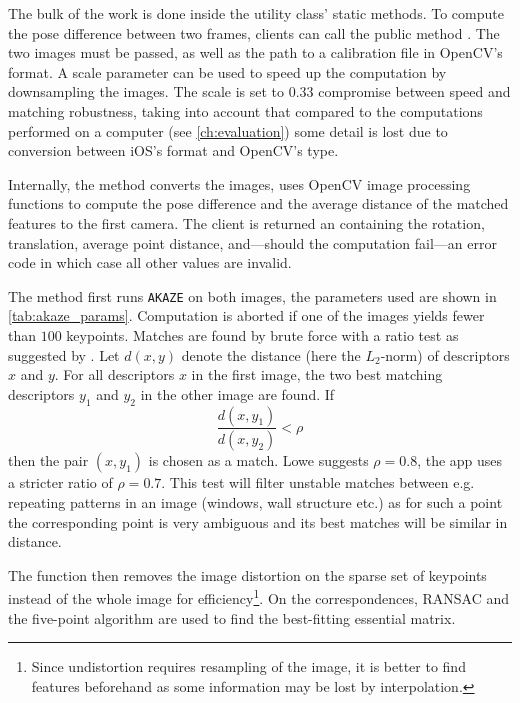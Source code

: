 
The bulk of the work is done inside the utility class'  static
methods. To compute the pose difference between two frames, clients can call the
public method .
The two images must be passed, as well as the path to a calibration file in
OpenCV's  format. A scale parameter can be used to speed up
the computation by downsampling the images.  The scale is set to $0.33$
compromise between speed and matching robustness, taking into account that
compared to the computations performed on a computer (see
\autoref{ch:evaluation}) some detail is lost due to conversion between iOS's
 format and OpenCV's  type.

Internally, the method converts the images, uses OpenCV image processing
functions to compute the pose difference and the average distance of the matched
features to the first camera. The client is returned an 
containing the rotation, translation, average point distance, and---should the
computation fail---an error code in which case all other values are invalid.

The method first runs \texttt{AKAZE} on both images, the parameters used are
shown in \autoref{tab:akaze_params}.  Computation is aborted if one of the
images yields fewer than $100$ keypoints.  Matches are found by brute force with
a ratio test as suggested by \citet{lowe2004}. Let $d(x,y)$ denote the distance
(here the $L_2$-norm) of descriptors $x$ and $y$. For all descriptors $x$ in the
first image, the two best matching descriptors $y_1$ and $y_2$ in the other
image are found. If
\begin{equation*}
   \frac{d(x,y_1)}{d(x,y_2)} < \rho
\end{equation*}
then the pair $(x,y_1)$ is chosen as a match. Lowe suggests $\rho=0.8$, the app
uses a stricter ratio of $\rho=0.7$. This test will filter unstable matches
between e.g. repeating patterns in an image (windows, wall structure etc.) as
for such a point the corresponding point is very ambiguous and its best matches
will be similar in distance.

The function then removes the image distortion on the sparse set of keypoints
instead of the whole image for efficiency\footnote{Since undistortion requires
   resampling of the image, it is better to find features beforehand as some
information may be lost by interpolation.}. On the correspondences, RANSAC and
the five-point algorithm are used to find the best-fitting essential matrix. 

